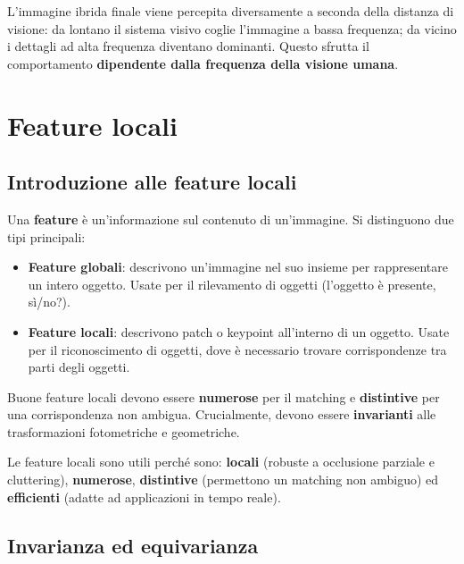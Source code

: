 \documentclass[12pt, a4paper]{report}
\begin{document}
L'immagine ibrida finale viene percepita diversamente a seconda della distanza di
visione: da lontano il sistema visivo coglie l'immagine a bassa frequenza; da vicino
i dettagli ad alta frequenza diventano dominanti.  Questo sfrutta il comportamento
\textbf{dipendente dalla frequenza della visione umana}.

\chapter{Feature locali}

\section{Introduzione alle feature locali}

\begin{defbox}[Feature]
Una \textbf{feature} è un'informazione sul contenuto di un'immagine.  Si distinguono
due tipi principali:
\begin{itemize}
  \item \textbf{Feature globali}: descrivono un'immagine nel suo insieme per
        rappresentare un intero oggetto.  Usate per il rilevamento di oggetti
        (l'oggetto è presente, sì/no?).
  \item \textbf{Feature locali}: descrivono patch o keypoint all'interno di un
        oggetto.  Usate per il riconoscimento di oggetti, dove è necessario trovare
        corrispondenze tra parti degli oggetti.
\end{itemize}
\end{defbox}

\begin{propbox}
Buone feature locali devono essere \textbf{numerose} per il matching e
\textbf{distintive} per una corrispondenza non ambigua.  Crucialmente, devono essere
\textbf{invarianti} alle trasformazioni fotometriche e geometriche.

Le feature locali sono utili perché sono: \textbf{locali} (robuste a occlusione
parziale e cluttering), \textbf{numerose}, \textbf{distintive} (permettono un
matching non ambiguo) ed \textbf{efficienti} (adatte ad applicazioni in tempo reale).
\end{propbox}

\section{Invarianza ed equivarianza}
\end{document}
